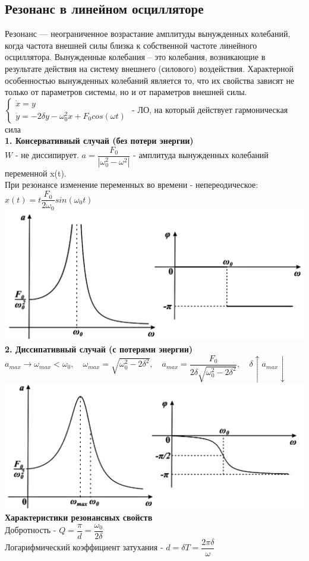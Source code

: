 \begin{multicols*}{2}
		\section{Резонанс в линейном осцилляторе}
		Резонанс — неограниченное возрастание амплитуды вынужденных колебаний, когда частота внешней силы близка к собственной частоте линейного осциллятора. Вынужденные колебания – это колебания, возникающие в результате действия на систему  внешнего (силового) воздействия. Характерной особенностью вынужденных  колебаний является то, что их свойства зависят не только от параметров системы, но и от параметров внешней силы.\\
		$\begin{cases}
			\dot{x} = y \\
			\dot{y} = -2\delta y-\omega_0^2 x + F_0 cos(\omega t)
		\end{cases} $ - ЛО, на который действует гармоническая сила\\
		\textbf{1. Консервативный случай (без потери энергии)}\\
		$W$ - не диссипирует. $a = \dfrac{F_0}{\left\lvert \omega_0^2 - \omega^2\right\rvert }$ - амплитуда вынужденных колебаний переменной x(t).\\
		При резонансе изменение переменных во времени - непереодическое: $x(t) = t\dfrac{F_0}{2\omega_0}sin(\omega_0 t)$\\
		\includegraphics[width=0.6\linewidth]{tk_img/rezonans_1.png}\\
		\textbf{2. Диссипативный случай (с потерями энергии)}\\
		$a_{max}\to \omega_{max}<\omega_0, \quad \omega_{max} = \sqrt{\omega_0^2 - 2\delta^2}, \quad a_{max} = \dfrac{F_0}{2\delta \sqrt{\omega_0^2 - 2\delta^2}}, \quad \delta \uparrow a_{max} \downarrow $\\
		\includegraphics[width=0.6\linewidth]{tk_img/rezonans_2.png}\\
		\textbf{Характеристики резонансных свойств}\\
		Добротность - $Q = \dfrac{\pi}{d} = \dfrac{\omega_0}{2\delta}$\\
		Логарифмический коэффициент затухания - $d = \delta T = \dfrac{2\pi \delta }{\omega}$
		

\end{multicols*}

